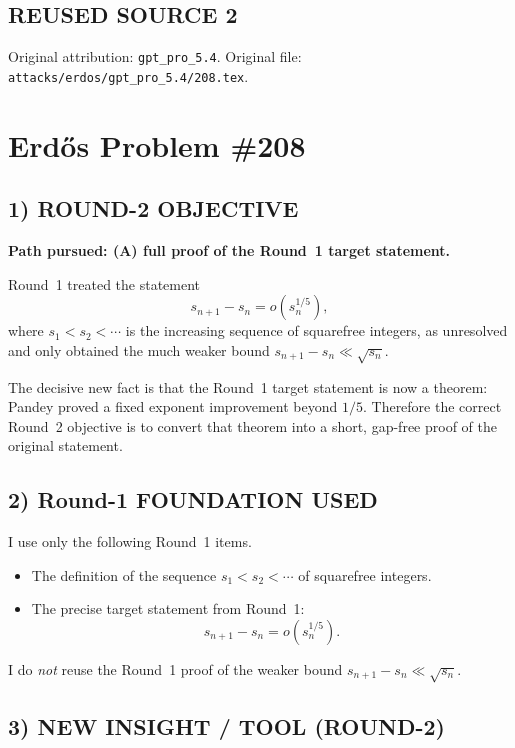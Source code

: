
\subsection*{REUSED SOURCE 2}
Original attribution: \texttt{gpt\_pro\_5.4}.
Original file: \texttt{attacks/erdos/gpt\_pro\_5.4/208.tex}.

\section{Erd\H{o}s Problem \#208}

\subsection*{1) ROUND-2 OBJECTIVE}

\textbf{Path pursued: (A) full proof of the Round~1 target statement.}

Round~1 treated the statement
\[
s_{n+1}-s_n=o(s_n^{1/5}),
\]
where $s_1<s_2<\cdots$ is the increasing sequence of squarefree integers, as unresolved and only obtained the much weaker bound $s_{n+1}-s_n\ll \sqrt{s_n}$.

The decisive new fact is that the Round~1 target statement is now a theorem: Pandey proved a fixed exponent improvement beyond $1/5$. Therefore the correct Round~2 objective is to convert that theorem into a short, gap-free proof of the original statement.

\subsection*{2) Round-1 FOUNDATION USED}

I use only the following Round~1 items.

\begin{itemize}
\item The definition of the sequence $s_1<s_2<\cdots$ of squarefree integers.
\item The precise target statement from Round~1:
\[
s_{n+1}-s_n=o(s_n^{1/5}).
\]
\end{itemize}

I do \emph{not} reuse the Round~1 proof of the weaker bound $s_{n+1}-s_n\ll \sqrt{s_n}$.

\subsection*{3) NEW INSIGHT / TOOL (ROUND-2)}

